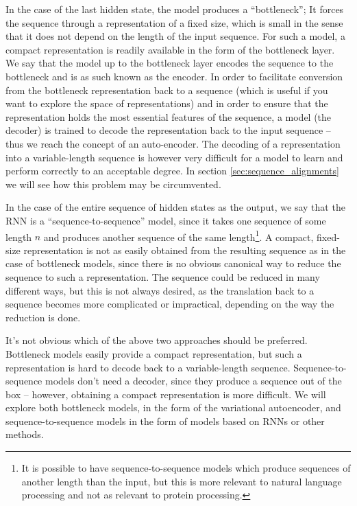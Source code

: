 In the case of the last hidden state, the model produces a ``bottleneck''; It forces the sequence through a representation of a fixed size, which is small in the sense that it does not depend on the length of the input sequence. For such a model, a compact representation is readily available in the form of the bottleneck layer. We say that the model up to the bottleneck layer encodes the sequence to the bottleneck and is as such known as the encoder. In order to facilitate conversion from the bottleneck representation back to a sequence (which is useful if you want to explore the space of representations) and in order to ensure that the representation holds the most essential features of the sequence, a model (the decoder) is trained to decode the representation back to the input sequence -- thus we reach the concept of an auto-encoder. The decoding of a representation into a variable-length sequence is however very difficult for a model to learn and perform correctly to an acceptable degree. In section \ref{sec:sequence_alignments} we will see how this problem may be circumvented.

In the case of the entire sequence of hidden states as the output, we say that the RNN is a ``sequence-to-sequence'' model, since it takes one sequence of some length $n$ and produces another sequence of the same length\footnote{It is possible to have sequence-to-sequence models which produce sequences of another length than the input, but this is more relevant to natural language processing and not as relevant to protein processing.}. A compact, fixed-size representation is not as easily obtained from the resulting sequence as in the case of bottleneck models, since there is no obvious canonical way to reduce the sequence to such a representation. The sequence could be reduced in many different ways, but this is not always desired, as the translation back to a sequence becomes more complicated or impractical, depending on the way the reduction is done.

It's not obvious which of the above two approaches should be preferred. Bottleneck models easily provide a compact representation, but such a representation is hard to decode back to a variable-length sequence. Sequence-to-sequence models don't need a decoder, since they produce a sequence out of the box -- however, obtaining a compact representation is more difficult. We will explore both bottleneck models, in the form of the variational autoencoder, and sequence-to-sequence models in the form of models based on RNNs or other methods.

